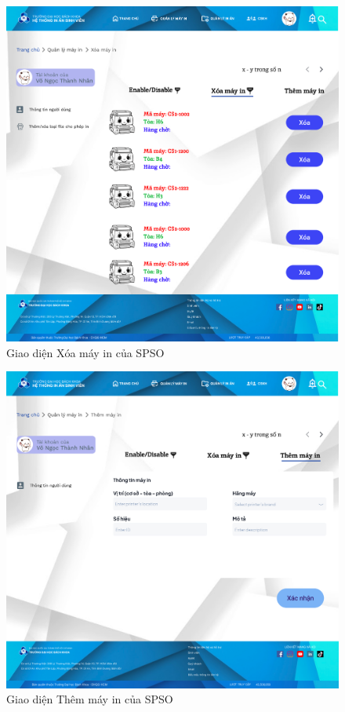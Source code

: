 \begin{figure}[H]
    \begin{center}
        \includegraphics[width=1\textwidth]{Images/Figma/Xóa máy in.png}
        \caption{Giao diện Xóa máy in của SPSO}
        \label{fig:arch}
    \end{center}
\end{figure}
\begin{figure}[H]
    \begin{center}
        \includegraphics[width=1\textwidth]{Images/Figma/Thêm máy in.png}
        \caption{Giao diện Thêm máy in của SPSO}
        \label{fig:arch}
    \end{center}
\end{figure}
